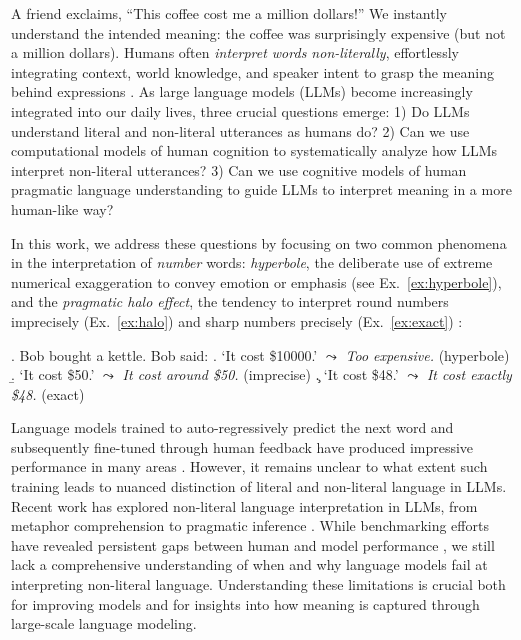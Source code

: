 A friend exclaims, ``This coffee cost me a million dollars!'' We instantly understand the intended meaning: the coffee was surprisingly expensive (but not a million dollars). Humans often \emph{interpret words non-literally}, effortlessly integrating context, world knowledge, and speaker intent to grasp the meaning behind expressions \citep{gibbs2006figurative}. As large language models (LLMs) become increasingly integrated into our daily lives, three crucial questions emerge: 1) Do LLMs understand literal and non-literal utterances as humans do? 2) Can we use computational models of human cognition to systematically analyze how LLMs interpret non-literal utterances? 3) Can we use cognitive models of human pragmatic language understanding to guide LLMs to interpret meaning in a more human-like way?

In this work, we address these questions by focusing on two common phenomena in the interpretation of \textit{number} words: \textit{hyperbole}, the deliberate use of extreme numerical exaggeration to convey emotion or emphasis (see Ex.~\ref{ex:hyperbole}), and the \textit{pragmatic halo effect}, the tendency to interpret round numbers imprecisely (Ex.~\ref{ex:halo}) and sharp numbers precisely (Ex.~\ref{ex:exact}) \citep{lasersohn1999pragmatic,Krifka2007:Approximate-Int}: 

\ex.\label{ex1} Bob bought a kettle. Bob said: 
\a.\label{ex:hyperbole} `It cost \$10000.' $\leadsto$ \textit{Too expensive.} \hfill (hyperbole)
\b.\label{ex:halo} `It cost \$50.' $\leadsto$ \textit{It cost around \$50.} \hfill (imprecise)
\c.\label{ex:exact} `It cost \$48.' $\leadsto$ \textit{It cost exactly \$48.} \hfill (exact)

Language models trained to auto-regressively predict the next word and subsequently fine-tuned through human feedback have produced impressive performance in many areas \citep[among many others]{srivastava2023-BIGbench}. However, it remains unclear to what extent such training leads to nuanced distinction of literal and non-literal language in LLMs.
Recent work has explored non-literal language interpretation in LLMs, from metaphor comprehension \citep{ tong-etal-2021-recent,liu-etal-2022-testing,prystawski2023psychologically} to pragmatic inference \citep{ jeretic-etal-2020-natural, ruis2024goldilocks}. 
While benchmarking efforts have revealed persistent gaps between human and model performance \citep{sravanthi-etal-2024-pub}, we still lack a comprehensive understanding of when and why language models fail at interpreting non-literal language. Understanding these limitations is crucial both for improving models and for insights into how meaning is captured through large-scale language modeling.

